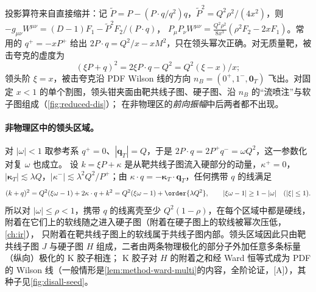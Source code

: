 \noindent
投影算符来自直接缩并：记 $\tilde P=P-(P\cdot q/q^2)q$，$\tilde P^2=Q^2\rho^2/(4x^2)$，则 $-g_{\mu\nu}W^{\mu\nu}=(D-1)F_1-\tilde P^2F_2/(P\cdot q)$，
$P_\mu P_\nu W^{\mu\nu}=\frac{Q^2\rho^2}{8x^3}(\rho^2F_2-2xF_1)$。常用的 $q^+=-xP^+$ 给出 $2P\cdot q=Q^2/x-xM^2$，只在领头幂次正确。对无质量靶，被击夸克的虚度为
\begin{equation}\label{eq:disall-current-virtuality}
(\xi P+q)^2=2\xi P\cdot q-Q^2=Q^2(\xi-x)/x;
\end{equation}
领头阶 $\xi=x$，被击夸克沿 PDF Wilson 线的方向 $n_B=(0^+,1^-,\mathbf 0_T)$ 飞出。对固定 $x<1$ 的单个割图，领头钳夹面由靶共线子图、硬子图、沿 $n_B$ 的“流喷注”与软子图组成（\cref{fig:reduced-dis}）；
在非物理区的\emph{前向振幅}中后两者都不出现。

\paragraph{非物理区中的领头区域。}
对 $|\omega|<1$ 取参考系 $q^+=0$、$|\mathbf q_T|=Q$，于是 $2P\cdot q=2P^+q^-=\omega Q^2$，这一参数化对复 $\omega$ 也成立。
设 $k=\xi P+\kappa$ 是从靶共线子图流入硬部分的动量，$\kappa^+=0$，$|\boldsymbol\kappa_T|\lesssim\lambda Q$，$|\kappa^-|\lesssim\lambda^2Q^2/P^+$；由 $\kappa\cdot q=-\boldsymbol\kappa_T\cdot\mathbf q_T$，任何携带 $q$ 的线满足
\begin{equation}\label{eq:disall-unphysical-offshell}
(k+q)^2=Q^2(\xi\omega-1)+2\kappa\cdot q+k^2=Q^2(\xi\omega-1)+\order{\lambda Q^2},\qquad |\xi\omega-1|\ge1-|\omega|\quad(|\xi|\le1).
\end{equation}
所以对 $|\omega|\le\rho<1$，携带 $q$ 的线离壳至少 $Q^2(1-\rho)$，在每个区域中都是硬线，附着在它们上的软线随之进入硬子图（附着在硬子图上的软线被幂次压低，\cref{ch:ir}），
只附着在靶共线子图上的软线属于共线子图内部。领头区域因此只由靶共线子图 $J$ 与硬子图 $H$ 组成，二者由两条物理极化的部分子外加任意多条标量（纵向）极化的 K 胶子相连；
K 胶子对 $H$ 的附着之和经 Ward 恒等式成为 PDF 的 Wilson 线（一般情形是\cref{lem:method-ward-multi}的内容，全阶论证，[A]），其种子见\cref{fig:disall-seed}。

